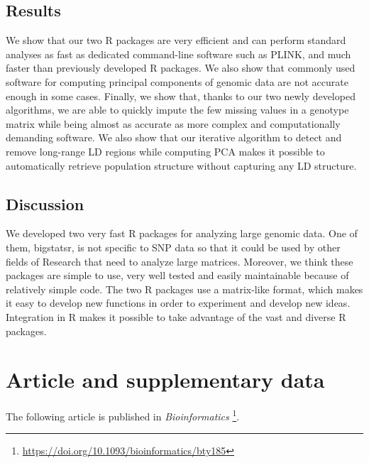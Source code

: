 \subsection{Results}

We show that our two R packages are very efficient and can perform standard analyses as fast as dedicated command-line software such as PLINK, and much faster than previously developed R packages.
We also show that commonly used software for computing principal components of genomic data are not accurate enough in some cases.
Finally, we show that, thanks to our two newly developed algorithms, we are able to quickly impute the few missing values in a genotype matrix while being almost as accurate as more complex and computationally demanding software. We also show that our iterative algorithm to detect and remove long-range LD regions while computing PCA makes it possible to automatically retrieve population structure without capturing any LD structure.

\subsection{Discussion}

We developed two very fast R packages for analyzing large genomic data. One of them, bigstatsr, is not specific to SNP data so that it could be used by other fields of Research that need to analyze large matrices.
Moreover, we think these packages are simple to use, very well tested and easily maintainable because of relatively simple code.
The two R packages use a matrix-like format, which makes it
easy to develop new functions in order to experiment and develop
new ideas. Integration in R makes it possible to take advantage of
the vast and diverse R packages.




\section{Article and supplementary data}

The following article is published in \textit{Bioinformatics}	\footnote{\url{https://doi.org/10.1093/bioinformatics/bty185}}.



